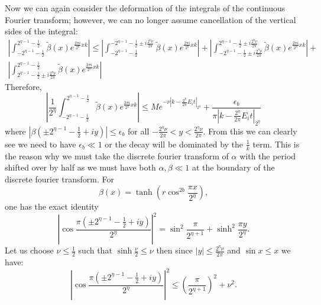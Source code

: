 \documentclass[aps,floatfix,10pt,amssymb,amsfont,amsmath,superscriptaddress,float,nofootinbib,longbibliography,nobalancelastpage,twocolumn]{revtex4-2}
\begin{document}
Now we can again consider the deformation of the integrals of the continuous Fourier transform; however, we can no longer assume cancellation of the vertical sides of the integral:
\begin{multline}
     \left|\int_{-2^{\eta-1}-\frac{1}{2}}^{2^{\eta-1}-\frac{1}{2}}\tilde\beta(x)e^{\frac{2\pi i}{2^{\eta}}xk}\right| \leq \left|\int_{-2^{\eta-1}-\frac{1}{2}}^{-2^{\eta-1}-\frac{1}{2}\pm i\frac{2^{\eta}\nu}{2\pi}}\tilde\beta(x)e^{\frac{2\pi i}{2^{\eta}}xk}\right|+\left|\int_{-2^{\eta-1}-\frac{1}{2}\pm i\frac{2^{\eta}\nu}{2\pi}}^{2^{\eta-1}-\frac{1}{2}\pm i\frac{2^{\eta}\nu}{2\pi}}\tilde\beta(x)e^{\frac{2\pi i}{2^{\eta}}xk}\right|+\\\left|\int_{2^{\eta-1}-\frac{1}{2}\pm i \frac{2^{\eta}\nu}{2\pi}}^{2^{\eta-1}-\frac{1}{2}}\tilde\beta(x)e^{\frac{2\pi i}{2^{\eta}}xk}\right|
\end{multline}
Therefore,
\begin{equation}
    \left|\frac{1}{2^{\eta}}\int_{-2^{\eta-1}-\frac{1}{2}}^{2^{\eta-1}-\frac{1}{2}}\tilde\beta(x)e^{\frac{2\pi i}{2^{\eta}}xk}\right| \leq Me^{-\nu|k-\frac{2^{\eta}}{2\pi}E_i t|_{2^{\eta}}} + \frac{\epsilon_b}{\pi|k-\frac{2^{\eta}}{2\pi}E_i t|_{2^{\eta}}}
\end{equation}
where $|\beta(\pm2^{\eta-1}-\frac{1}{2}+iy)| \leq\epsilon_b$ for all $-\frac{2^{\eta}\nu}{2\pi}<y<\frac{2^{\eta}\nu}{2\pi}$. From this we can clearly see we need to have $\epsilon_b \ll 1$ or the decay will be dominated by the $\frac{1}{k}$ term. This is the reason why we must take the discrete fourier transform of $\alpha$ with the period shifted over by half as we must have both $\alpha, \beta \ll 1$ at the boundary of the discrete fourier transform. For
\begin{equation}
\beta(x)=\tanh\!\left(r\cos^{2b}\frac{\pi x}{2^{\eta}}\right),
\label{eq:betadefinitionvertical}
\end{equation}
one has the exact identity
\begin{equation}
\left|
\cos\frac{\pi\left(\pm2^{\eta-1}-\frac12+iy\right)}{2^{\eta}}
\right|^2
=
\sin^2\frac{\pi}{2^{\eta+1}}
+\sinh^2\frac{\pi y}{2^{\eta}}.
\label{eq:verticalcosineidentity}
\end{equation}
Let us choose $\nu \leq \frac{1}{2}$ such that $\sinh \frac{\nu}{2} \leq \nu$ then since $|y|\leq\frac{2^{\eta}\nu}{2\pi}$ and $\sin x\leq x$ we have:
\begin{equation}
\left|
\cos\frac{\pi\left(\pm2^{\eta-1}-\frac12+iy\right)}{2^{\eta}}
\right|^2
\leq
\left(\frac{\pi}{2^{\eta+1}}\right)^2+\nu^2.
\label{eq:verticalcosinebound}
\end{equation}
\end{document}
